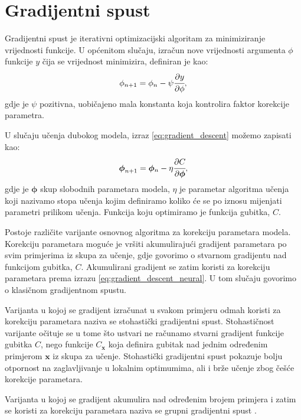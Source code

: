\documentclass[times, utf8, diplomski, numeric]{fer}
\begin{document}
\section{Gradijentni spust}

Gradijentni spust je iterativni optimizacijski algoritam za minimiziranje vrijednosti funkcije.
U općenitom slučaju, izračun nove vrijednosti argumenta $\phi$ funkcije $y$ čija se vrijednost minimizira, definiran je kao:
\begin{equation}
 \phi_{n+1} = \phi_n - \psi \cfrac{\partial y}{\partial \phi}, \label{eq:gradient_descent}
\end{equation}
gdje je $\psi$ pozitivna, uobičajeno mala konstanta koja kontrolira faktor korekcije parametra.

\noindent U slučaju učenja dubokog modela, izraz \ref{eq:gradient_descent} možemo zapisati kao:
\begin{equation}
 \boldsymbol{\phi}_{n+1} = \boldsymbol{\phi}{_n} - \eta \cfrac{\partial C}{\partial \boldsymbol{\phi}}, \label{eq:gradient_descent_neural}
\end{equation}
gdje je $\boldsymbol{\phi}$ skup slobodnih parametara modela, $\eta$ je parametar algoritma učenja koji nazivamo stopa učenja  kojim definiramo koliko će se po iznosu mijenjati parametri prilikom učenja.
Funkcija koju optimiramo je funkcija gubitka, $C$.

Postoje različite varijante osnovnog algoritma za korekciju parametara modela. 
Korekciju parametara moguće je vršiti akumulirajući gradijent parametara po svim primjerima iz skupa za učenje, gdje govorimo o stvarnom gradijentu nad funkcijom gubitka, $C$. 
Akumulirani gradijent se zatim koristi za korekciju parametara prema izrazu \ref{eq:gradient_descent_neural}. U tom slučaju govorimo o klasičnom gradijentnom spustu.

Varijanta u kojoj se gradijent izračunat u svakom primjeru odmah koristi za korekciju parametara naziva se stohastički gradijentni spust. 
Stohastičnost varijante očituje se u tome što ustvari ne računamo stvarni gradijent funkcije gubitka $C$, nego funkcije $C_\mathbf{x}$ koja definira gubitak nad jednim određenim primjerom $\mathbf{x}$ iz skupa za učenje.
Stohastički gradijentni spust pokazuje bolju otpornost na zaglavljivanje u lokalnim optimumima, ali i brže učenje zbog češće korekcije parametara.

Varijanta u kojoj se gradijent akumulira nad određenim brojem primjera i zatim se koristi za korekciju parametara naziva se grupni  gradijentni spust \citep{seminar:rela}.
\end{document}
